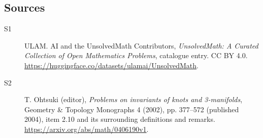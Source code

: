 \documentclass[11pt]{article}
\begin{document}
\subsection{Sources}
\begin{description}
\item[\hypertarget{source:statement:1}{S1}] ULAM. AI and the UnsolvedMath Contributors, \emph{UnsolvedMath: A Curated Collection of Open Mathematics Problems}, catalogue entry. CC BY 4.0. \url{https://huggingface.co/datasets/ulamai/UnsolvedMath}.
\item[\hypertarget{source:statement:2}{S2}] T. Ohtsuki (editor), \emph{Problems on invariants of knots and 3-manifolds}, Geometry \& Topology Monographs 4 (2002), pp. 377--572 (published 2004), item 2.10 and its surrounding definitions and remarks. \url{https://arxiv.org/abs/math/0406190v1}.
\end{description}
\label{end:statement}
\end{document}
